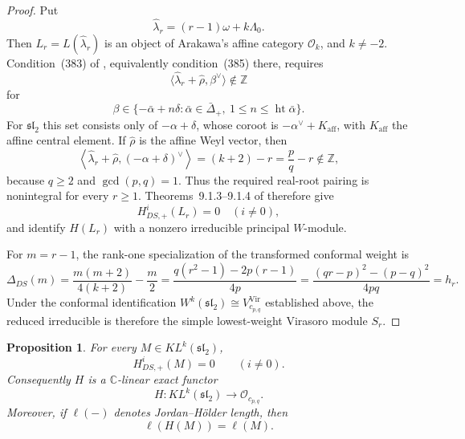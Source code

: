 \documentclass[12pt,leqno]{amsart}
\numberwithin{equation}{section}
\newtheorem{prop}[thm]{Proposition}
\newcommand{\KL}{KL}
\newcommand{\Oc}{\mathcal O}
\def\Z{\mathbb{Z}}
\def\C{\mathbb{C}}
\begin{document}
\begin{proof}
Put
\[
 \widehat\lambda_r=(r-1)\omega+k\Lambda_0.
\]
Then $L_r=L(\widehat\lambda_r)$ is an object of Arakawa's affine
category $\mathcal O_k$, and $k\ne-2$.  Condition~(383) of
\cite[Section~9.1]{ArakawaW}, equivalently condition~(385) there,
requires
\[
 \langle\widehat\lambda_r+\widehat\rho,\beta^\vee\rangle
 \notin\Z
\]
for
\[
 \beta\in\{-\bar\alpha+n\delta:
 \bar\alpha\in\bar\Delta_+,\ 1\le n\le
 \operatorname{ht}\bar\alpha\}.
\]
For $\mathfrak{sl}_2$ this set consists only of $-\alpha+\delta$,
whose coroot is
$-\alpha^\vee+K_{\mathrm{aff}}$, with $K_{\mathrm{aff}}$ the affine
central element.  If $\widehat\rho$ is the affine Weyl vector, then
\[
 \left\langle
 \widehat\lambda_r+\widehat\rho,
 (-\alpha+\delta)^\vee
 \right\rangle
 =(k+2)-r=\frac pq-r\notin\Z,
\]
because $q\ge2$ and $\gcd(p,q)=1$.  Thus the required real-root pairing is nonintegral for
every $r\ge1$.  Theorems~9.1.3--9.1.4 of \cite{ArakawaW} therefore
give
\[
 H^i_{DS,+}(L_r)=0\quad(i\neq0),
\]
and identify $H(L_r)$ with a nonzero irreducible principal $W$-module.

For $m=r-1$, the rank-one specialization of the transformed conformal
weight is
\[
 \Delta_{DS}(m)
 =\frac{m(m+2)}{4(k+2)}-\frac m2
 =\frac{q(r^2-1)-2p(r-1)}{4p}
 =\frac{(qr-p)^2-(p-q)^2}{4pq}=h_r.
\]
Under the conformal identification
$W^k(\mathfrak{sl}_2)\cong V^{\mathrm{Vir}}_{c_{p,q}}$ established
above, the reduced irreducible is therefore the simple lowest-weight
Virasoro module $S_r$.
\end{proof}


\begin{prop}\label{prop:H-exact}
For every $M\in\KL^k(\mathfrak{sl}_2)$,
\[
 H^i_{DS,+}(M)=0\qquad(i\neq0).
\]
Consequently $H$ is a $\C$-linear exact functor
\[
 H:\KL^k(\mathfrak{sl}_2)\longrightarrow\Oc_{c_{p,q}}.
\]
Moreover, if $\ell(-)$ denotes Jordan--H\"older length, then
\begin{equation}\label{eq:H-length}
 \ell(H(M))=\ell(M).
\end{equation}
\end{prop}
\end{document}
